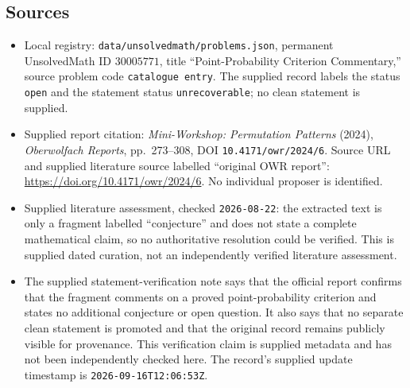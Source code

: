 \documentclass[11pt]{article}
\begin{document}
\subsection{Sources}
\begin{itemize}
\item Local registry: \texttt{data/unsolvedmath/problems.json}, permanent UnsolvedMath ID \(30005771\), title ``Point-Probability Criterion Commentary,'' source problem code \texttt{catalogue entry}. The supplied record labels the status \texttt{open} and the statement status \texttt{unrecoverable}; no clean statement is supplied.
\item Supplied report citation: \emph{Mini-Workshop: Permutation Patterns} (2024), \emph{Oberwolfach Reports}, pp.\ 273--308, DOI \texttt{10.4171/owr/2024/6}. Source URL and supplied literature source labelled ``original OWR report'': \url{https://doi.org/10.4171/owr/2024/6}. No individual proposer is identified.
\item Supplied literature assessment, checked \texttt{2026-08-22}: the extracted text is only a fragment labelled ``conjecture'' and does not state a complete mathematical claim, so no authoritative resolution could be verified. This is supplied dated curation, not an independently verified literature assessment.
\item The supplied statement-verification note says that the official report confirms that the fragment comments on a proved point-probability criterion and states no additional conjecture or open question. It also says that no separate clean statement is promoted and that the original record remains publicly visible for provenance. This verification claim is supplied metadata and has not been independently checked here. The record's supplied update timestamp is \texttt{2026-09-16T12:06:53Z}.
\end{itemize}
\end{document}
